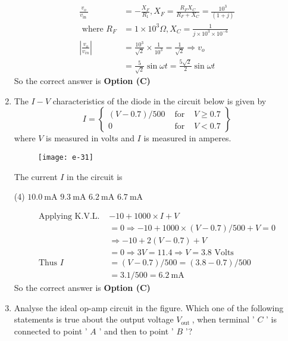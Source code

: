 \begin{enumerate}
\begin{answer}
\begin{align*}
\frac{v_{o}}{v_{\text {in }}}&=-\frac{X_{F}}{R_{1}}, X_{F}=\frac{R_{F} X_{C}}{R_{F}+X_{C}}=\frac{10^{3}}{(1+j)}\\\text{ where }R_{F}&=1 \times 10^{3} \Omega, X_{C}=\frac{1}{j \times 10^{3} \times 10^{-6}}\\
\left|\frac{v_{o}}{v_{i n}}\right|&=\frac{10^{3}}{\sqrt{2}} \times \frac{1}{10^{3}}=\frac{1}{\sqrt{2}} \Rightarrow v_{o}\\&=\frac{5}{\sqrt{2}} \sin \omega t=\frac{5 \sqrt{2}}{2} \sin \omega t
\end{align*}
So the correct answer is \textbf{Option (C)}
\end{answer}
	\item The $I-V$ characteristics of the diode in the circuit below is given by
	$$
	I=\left\{\begin{array}{rll}
	(V-0.7) / 500 & \text { for } & V \geq 0.7 \\
	0 & \text { for } & V<0.7
	\end{array}\right\}
	$$
	where $V$ is measured in volts and $I$ is measured in amperes.\\
	\begin{figure}[H]
		\centering
		\texttt{[image: e-31]}
	\end{figure}
	The current $I$ in the circuit is
{	}
\begin{tasks}(4)
\task[\textbf{A.}] $10.0 \mathrm{~mA}$
\task[\textbf{B.}] $9.3 \mathrm{~mA}$
\task[\textbf{C.}] $6.2 \mathrm{~mA}$
\task[\textbf{D.}] $6.7 \mathrm{~mA}$
\end{tasks}
\begin{answer}
\begin{align*}
\text{Applying K.V.L. }&-10+1000 \times I+V\\&=0 \Rightarrow-10+1000 \times(V-0.7) / 500+V=0\\
&\Rightarrow-10+2(V-0.7)+V\\&=0 \Rightarrow 3 V=11.4 \Rightarrow V=3.8\text{ Volts}\\
\text{Thus }I&=(V-0.7) / 500=(3.8-0.7) / 500\\&=3.1 / 500=6.2 \mathrm{~mA}
\end{align*}
So the correct answer is \textbf{Option (C)}
\end{answer}
	\item Analyse the ideal op-amp circuit in the figure. Which one of the following statements is true about the output voltage $V_{\text {out }}$, when terminal ' $C$ ' is connected to point ' $A$ ' and then to point ' $B$ '?

\end{enumerate}
